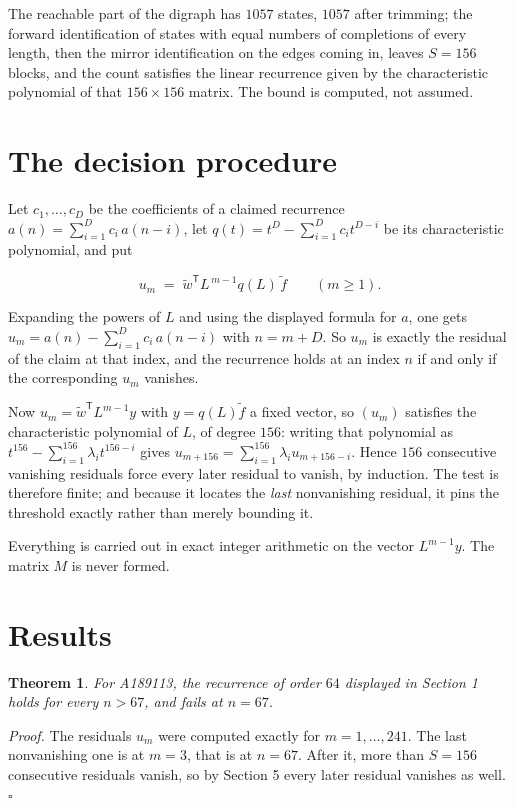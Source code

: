 \documentclass[11pt]{article}
\newtheorem{theorem}{Theorem}
\theoremstyle{definition}
\begin{document}
The reachable part of the digraph has $1057$ states, $1057$ after trimming; the forward identification of states with equal numbers of completions of every length, then the mirror identification on the edges coming in, leaves $S = 156$ blocks, and the count satisfies the linear recurrence given by the characteristic polynomial of that $156\times156$ matrix. The bound is computed, not assumed.

\section{The decision procedure}

Let $c_1,\dots,c_D$ be the coefficients of a claimed recurrence $a(n) = \sum_{i=1}^{D} c_i\,a(n-i)$, let $q(t) = t^{D} - \sum_{i=1}^{D} c_i t^{D-i}$ be its characteristic polynomial, and put

\[u_m \;=\; \tilde w^{\mathsf T} L^{\,m-1} q(L)\,\tilde f \qquad (m \ge 1).\]

Expanding the powers of $L$ and using the displayed formula for $a$, one gets $u_m = a(n) - \sum_{i=1}^{D} c_i\,a(n-i)$ with $n = m + D$. So $u_m$ is exactly the residual of the claim at that index, and the recurrence holds at an index $n$ if and only if the corresponding $u_m$ vanishes.

Now $u_m = \tilde w^{\mathsf T} L^{m-1} y$ with $y = q(L)\tilde f$ a fixed vector, so $(u_m)$ satisfies the characteristic polynomial of $L$, of degree $156$: writing that polynomial as $t^{156} - \sum_{i=1}^{156} \lambda_i t^{156-i}$ gives $u_{m+156} = \sum_{i=1}^{156} \lambda_i u_{m+156-i}$. Hence $156$ consecutive vanishing residuals force every later residual to vanish, by induction. The test is therefore finite; and because it locates the {\itshape last} nonvanishing residual, it pins the threshold exactly rather than merely bounding it.

Everything is carried out in exact integer arithmetic on the vector $L^{m-1}y$. The matrix $M$ is never formed.

\section{Results}

\begin{theorem} For A189113, the recurrence of order $64$ displayed in Section 1 holds for every $n > 67$, and fails at $n = 67$.\end{theorem}

{\itshape Proof.} The residuals $u_m$ were computed exactly for $m = 1,\dots,241$. The last nonvanishing one is at $m = 3$, that is at $n = 67$. After it, more than $S = 156$ consecutive residuals vanish, so by Section 5 every later residual vanishes as well. $\square$
\end{document}
